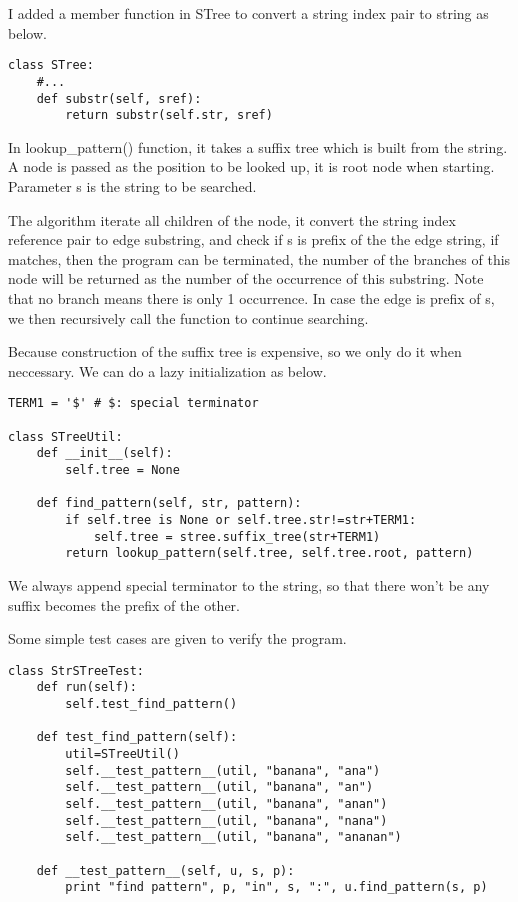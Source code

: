\documentclass{article}
\begin{document}
I added a member function in STree to convert a string index
pair to string as below.

\begin{lstlisting}
class STree:
    #...
    def substr(self, sref):
        return substr(self.str, sref)
\end{lstlisting}

In lookup\_pattern() function, it takes a suffix tree which 
is built from the string.
A node is passed as the position to be looked up, it is root node when 
starting. Parameter s is the string to be searched.

The algorithm iterate all children of the node, it convert the string
index reference pair to edge substring, and check if s is prefix of the
the edge string, if matches, then the program can be terminated, the
number of the branches of this node will be returned as the number
of the occurrence of this substring. Note that no branch means there 
is only 1 occurrence. In case the edge is prefix of s, we then
recursively call the function to continue searching.

Because construction of the suffix tree is expensive, so we only 
do it when neccessary. We can do a lazy initialization as below.

\begin{lstlisting}
TERM1 = '$' # $: special terminator

class STreeUtil:
    def __init__(self):
        self.tree = None

    def find_pattern(self, str, pattern):
        if self.tree is None or self.tree.str!=str+TERM1:
            self.tree = stree.suffix_tree(str+TERM1)
        return lookup_pattern(self.tree, self.tree.root, pattern)
\end{lstlisting}

We always append special terminator to the string, so that there won't
be any suffix becomes the prefix of the other\cite{wiki-suffix-tree}.

Some simple test cases are given to verify the program.

\begin{lstlisting}
class StrSTreeTest:
    def run(self):
        self.test_find_pattern()

    def test_find_pattern(self):
        util=STreeUtil()
        self.__test_pattern__(util, "banana", "ana")
        self.__test_pattern__(util, "banana", "an")
        self.__test_pattern__(util, "banana", "anan")
        self.__test_pattern__(util, "banana", "nana")
        self.__test_pattern__(util, "banana", "ananan")

    def __test_pattern__(self, u, s, p):
        print "find pattern", p, "in", s, ":", u.find_pattern(s, p)
\end{lstlisting}
\end{document}
